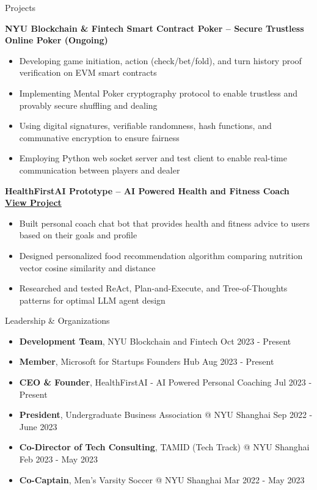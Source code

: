 \documentclass{resume} %
\begin{document}
\begin{rSection}{Projects}

	\textbf{NYU Blockchain \& Fintech Smart Contract Poker – Secure Trustless Online Poker (Ongoing)}
	\begin{itemize}
		\item Developing game initiation, action (check/bet/fold), and turn history proof verification on EVM smart contracts
		\item Implementing Mental Poker cryptography protocol to enable trustless and provably secure shuffling and dealing
		\item Using digital signatures, verifiable randomness, hash functions, and communative encryption to ensure fairness
		\item Employing Python web socket server and test client to enable real-time communication between players and dealer
	\end{itemize}

	\textbf{HealthFirstAI Prototype – AI Powered Health and Fitness Coach \href{https://github.com/healthfirstai/prototype-backend}{View Project}}
	\begin{itemize}
		\item Built personal coach chat bot that provides health and fitness advice to users based on their goals and profile
		\item Designed personalized food recommendation algorithm comparing nutrition vector cosine similarity and distance
		\item Researched and tested ReAct, Plan-and-Execute, and Tree-of-Thoughts patterns for optimal LLM agent design
	\end{itemize}

\end{rSection}


\begin{rSection}{Leadership \& Organizations}
	\begin{itemize}
		\item \textbf{Development Team}{, NYU Blockchain and Fintech} \hfill Oct 2023 - Present
		\item \textbf{Member}{, Microsoft for Startups Founders Hub} \hfill Aug 2023 - Present
		\item \textbf{CEO \& Founder}{, HealthFirstAI - AI Powered Personal Coaching} \hfill Jul 2023 - Present
		\item \textbf{President}{, Undergraduate Business Association @ NYU Shanghai} \hfill Sep 2022 - June 2023
		\item \textbf{Co-Director of Tech Consulting}{, TAMID (Tech Track) @ NYU Shanghai} \hfill Feb 2023 - May 2023
		\item \textbf{Co-Captain}{, Men's Varsity Soccer @ NYU Shanghai} \hfill Mar 2022 - May 2023
	\end{itemize}
\end{rSection}
\end{document}
